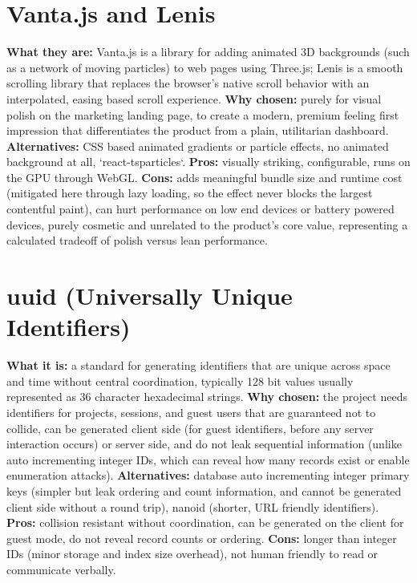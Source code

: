 \documentclass[11pt,a4paper]{report}
\begin{document}
\section{Vanta.js and Lenis}
\textbf{What they are:} Vanta.js is a library for adding animated 3D backgrounds (such as a network of moving particles) to web pages using Three.js; Lenis is a smooth scrolling library that replaces the browser's native scroll behavior with an interpolated, easing based scroll experience.
\textbf{Why chosen:} purely for visual polish on the marketing landing page, to create a modern, premium feeling first impression that differentiates the product from a plain, utilitarian dashboard.
\textbf{Alternatives:} CSS based animated gradients or particle effects, no animated background at all, `react-tsparticles`.
\textbf{Pros:} visually striking, configurable, runs on the GPU through WebGL.
\textbf{Cons:} adds meaningful bundle size and runtime cost (mitigated here through lazy loading, so the effect never blocks the largest contentful paint), can hurt performance on low end devices or battery powered devices, purely cosmetic and unrelated to the product's core value, representing a calculated tradeoff of polish versus lean performance.

\section{uuid (Universally Unique Identifiers)}
\textbf{What it is:} a standard for generating identifiers that are unique across space and time without central coordination, typically 128 bit values usually represented as 36 character hexadecimal strings.
\textbf{Why chosen:} the project needs identifiers for projects, sessions, and guest users that are guaranteed not to collide, can be generated client side (for guest identifiers, before any server interaction occurs) or server side, and do not leak sequential information (unlike auto incrementing integer IDs, which can reveal how many records exist or enable enumeration attacks).
\textbf{Alternatives:} database auto incrementing integer primary keys (simpler but leak ordering and count information, and cannot be generated client side without a round trip), nanoid (shorter, URL friendly identifiers).
\textbf{Pros:} collision resistant without coordination, can be generated on the client for guest mode, do not reveal record counts or ordering.
\textbf{Cons:} longer than integer IDs (minor storage and index size overhead), not human friendly to read or communicate verbally.
\end{document}
